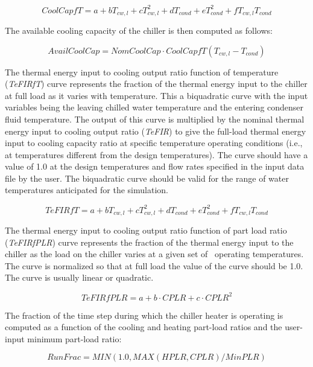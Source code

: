 \begin{equation}
CoolCapfT = a + b{T_{cw,l}} + cT_{cw,l}^2 + d{T_{cond}} + eT_{cond}^2 + f{T_{cw,l}}{T_{cond}}
\end{equation}

The available cooling capacity of the chiller is then computed as follows:

\begin{equation}
AvailCoolCap = NomCoolCap \cdot CoolCapfT({T_{cw,l}} - {T_{cond}})
\end{equation}

The thermal energy input to cooling output ratio function of temperature (\emph{TeFIRfT}) curve represents the fraction of the thermal energy input to the chiller at full load as it varies with temperature. This a biquadratic curve with the input variables being the leaving chilled water temperature and the entering condenser fluid temperature. The output of this curve is multiplied by the nominal thermal energy input to cooling output ratio (\emph{TeFIR}) to give the full-load thermal energy input to cooling capacity ratio at specific temperature operating conditions (i.e., at temperatures different from the design temperatures). The curve should have a value of 1.0 at the design temperatures and flow rates specified in the input data file by the user. The biquadratic curve should be valid for the range of water temperatures anticipated for the simulation.

\begin{equation}
TeFIRfT = a + b{T_{cw,l}} + cT_{cw,l}^2 + d{T_{cond}} + eT_{cond}^2 + f{T_{cw,l}}{T_{cond}}
\end{equation}

The thermal energy input to cooling output ratio function of part load ratio (\emph{TeFIRfPLR}) curve represents the fraction of the thermal energy input to the chiller as the load on the chiller varies at a given set of~ operating temperatures. The curve is normalized so that at full load the value of the curve should be 1.0. The curve is usually linear or quadratic.

\begin{equation}
TeFIRfPLR = a + b \cdot CPLR + c \cdot CPL{R^2}
\end{equation}

The fraction of the time step during which the chiller heater is operating is computed as a function of the cooling and heating part-load ratios and the user-input minimum part-load ratio:

\begin{equation}
RunFrac = MIN(1.0,MAX\left( {HPLR,CPLR} \right)/MinPLR)
\end{equation}

